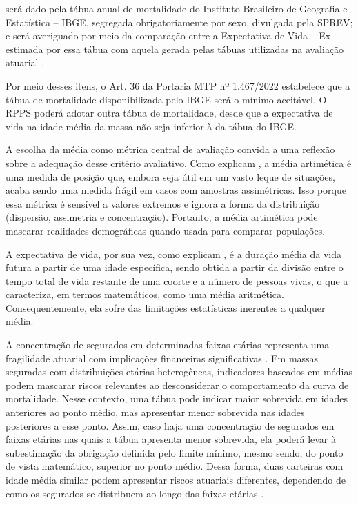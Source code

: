 \begin{citacao}
\noindent
[...] será dado pela tábua anual de mortalidade do Instituto Brasileiro de Geografia e Estatística -- IBGE, segregada obrigatoriamente por sexo, divulgada pela SPREV; e será averiguado por meio da comparação entre a Expectativa de Vida -- Ex estimada por essa tábua com aquela gerada pelas tábuas utilizadas na avaliação atuarial \cite[p.~28]{mtp1467_2022}.
\end{citacao}

Por meio desses itens, o Art. 36 da Portaria MTP nº 1.467/2022 estabelece que a tábua de mortalidade disponibilizada pelo IBGE será o mínimo aceitável. O RPPS poderá adotar outra tábua de mortalidade, desde que a expectativa de vida na idade média da massa não seja inferior à da tábua do IBGE.

A escolha da média como métrica central de avaliação convida a uma reflexão sobre a adequação desse critério avaliativo. Como explicam , a média artimética é uma medida de posição que, embora seja útil em um vasto leque de situações, acaba sendo uma medida frágil em casos com amostras assimétricas. Isso porque essa métrica é sensível a valores extremos e ignora a forma da distribuição (dispersão, assimetria e concentração). Portanto, a média artimética pode mascarar realidades demográficas quando usada para comparar populações.

A expectativa de vida, por sua vez, como explicam , é a duração média da vida futura a partir de uma idade específica, sendo obtida a partir da divisão entre o tempo total de vida restante de uma coorte e a número de pessoas vivas, o que a caracteriza, em termos matemáticos, como uma média aritmética. Consequentemente, ela sofre das limitações estatísticas inerentes a qualquer média.

A concentração de segurados em determinadas faixas etárias representa uma fragilidade atuarial com implicações financeiras significativas \cite{antolin2007longevity}. Em massas seguradas com distribuições etárias heterogêneas, indicadores baseados em médias podem mascarar riscos relevantes ao desconsiderar o comportamento da curva de mortalidade. Nesse contexto, uma tábua pode indicar maior sobrevida em idades anteriores ao ponto médio, mas apresentar menor sobrevida nas idades posteriores a esse ponto. Assim, caso haja uma concentração de segurados em faixas etárias nas quais a tábua apresenta menor sobrevida, ela poderá levar à subestimação da obrigação definida pelo limite mínimo, mesmo sendo, do ponto de vista matemático, superior no ponto médio. Dessa forma, duas carteiras com idade média similar podem apresentar riscos atuariais diferentes, dependendo de como os segurados se distribuem ao longo das faixas etárias \cite{rockefeller2016pension}.

